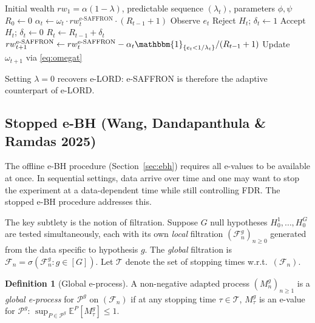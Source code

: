 \documentclass[11pt,a4paper]{article}
\theoremstyle{plain}
\theoremstyle{definition}
\newtheorem{definition}[theorem]{Definition}
\theoremstyle{remark}
\newcommand{\E}{\mathbb{E}}
\newcommand{\ind}{\mathbbm{1}}
\begin{document}
\begin{algorithm}
\caption{e-SAFFRON}
\label{alg:esaffron}
\begin{algorithmic}[1]
\Require Initial wealth $rw_1 = \alpha(1 - \lambda)$, predictable sequence $(\lambda_t)$, parameters $\phi, \psi$
\State $R_0 \leftarrow 0$
    \State $\alpha_t \leftarrow \omega_t \cdot rw_t^{\text{e-SAFFRON}} \cdot (R_{t-1}+1)$
    \State Observe $e_t$
        \State Reject $H_t$; $\delta_t \leftarrow 1$
    \Else
        \State Accept $H_t$; $\delta_t \leftarrow 0$
    \EndIf
    \State $R_t \leftarrow R_{t-1} + \delta_t$
    \State $rw_{t+1}^{\text{e-SAFFRON}} \leftarrow rw_t^{\text{e-SAFFRON}} - \alpha_t \ind_{\{e_t < 1/\lambda_t\}}/(R_{t-1}+1)$
    \State Update $\omega_{t+1}$ via \eqref{eq:omegat}
\EndFor
\end{algorithmic}
\end{algorithm}

Setting $\lambda = 0$ recovers e-LORD: e-SAFFRON is therefore the adaptive
counterpart of e-LORD.

\subsection{Stopped e-BH (Wang, Dandapanthula \& Ramdas 2025)}
\label{sec:stopped}

The offline e-BH procedure (Section~\ref{sec:ebh}) requires all e-values to
be available at once. In sequential settings, data arrive over time and one
may want to stop the experiment at a data-dependent time while still
controlling FDR. The stopped e-BH procedure addresses this.

The key subtlety is the notion of filtration. Suppose $G$ null hypotheses
$H_0^1, \ldots, H_0^G$ are tested simultaneously, each with its own
\emph{local} filtration $(\mathcal{F}_n^g)_{n \geq 0}$ generated from the
data specific to hypothesis $g$. The \emph{global} filtration is
$\mathcal{F}_n = \sigma(\mathcal{F}_n^g : g \in [G])$. Let $\mathcal{T}$
denote the set of stopping times w.r.t.\ $(\mathcal{F}_n)$.

\begin{definition}[Global e-process]
A non-negative adapted process $(M_n^g)_{n \geq 1}$ is a \emph{global
e-process} for $\mathcal{P}^g$ on $(\mathcal{F}_n)$ if at any stopping time
$\tau \in \mathcal{T}$, $M_\tau^g$ is an e-value for $\mathcal{P}^g$:
$\sup_{P \in \mathcal{P}^g} \E^P[M_\tau^g] \leq 1$.
\end{definition}
\end{document}
